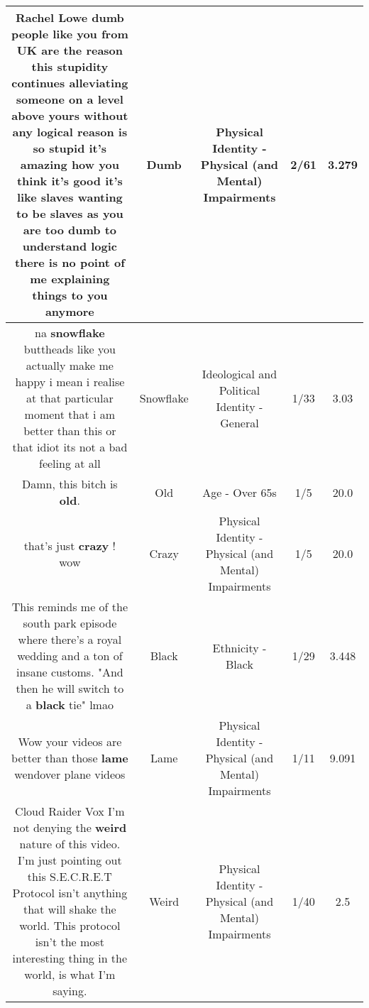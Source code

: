 \documentclass[11pt]{article}
\newlength\mylength
\begin{document}
\begin{center}
\begin{longtable}{|C{.65\mylength}|C{.30\mylength}|C{.12\mylength}|C{.12\mylength}|C{.12\mylength}|}
  \small Rachel Lowe \textbf{dumb} people like you from UK are the reason this stupidity continues alleviating someone on a level above yours without any logical reason is so stupid it's amazing how you think it's good it's like slaves wanting to be slaves as you are too \textbf{dumb} to understand logic there is no point of me explaining things to you anymore\normalsize   & Dumb & Physical Identity - Physical (and Mental) Impairments & 2/61 & 3.279 \\  \hline
  \small na \textbf{snowflake} buttheads like you actually make me happy i mean i realise at that particular moment that i am better than this or that idiot its not a bad feeling at all\normalsize   & Snowflake &  Ideological and Political Identity - General & 1/33 & 3.03 \\  \hline
  \small Damn, this bitch is \textbf{old}.\normalsize   & Old & Age - Over 65s & 1/5 & 20.0 \\  \hline
  \small that's just \textbf{crazy} ! wow\normalsize   & Crazy & Physical Identity - Physical (and Mental) Impairments & 1/5 & 20.0 \\  \hline
  \small This reminds me of the south park episode where there's a royal wedding and a ton of insane customs. "And then he will switch to a \textbf{black} tie" lmao\normalsize   & Black & Ethnicity - Black & 1/29 & 3.448 \\  \hline
  \small Wow your videos are better than those \textbf{lame} wendover plane videos\normalsize   & Lame & Physical Identity - Physical (and Mental) Impairments & 1/11 & 9.091 \\  \hline
  \small Cloud Raider Vox I'm not denying the \textbf{weird} nature of this video. I'm just pointing out this S.E.C.R.E.T Protocol isn't anything that will shake the world. This protocol isn't the most interesting thing in the world, is what I'm saying.\normalsize   & Weird & Physical Identity - Physical (and Mental) Impairments & 1/40 & 2.5 \\  \hline

\end{longtable}
\end{center}
\end{document}
